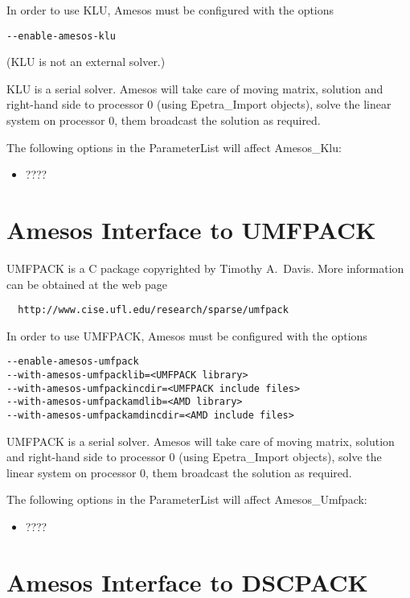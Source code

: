 \documentclass[11pt]{SANDreport}
\begin{document}
\smallskip

In order to use KLU, Amesos must be configured with the options
\begin{verbatim}
--enable-amesos-klu
\end{verbatim}
(KLU is not an external solver.)

KLU is a serial solver. Amesos will take care of moving matrix,
solution and right-hand side to processor 0 (using Epetra\_Import
objects), solve the linear system on processor 0, them broadcast the
solution as required.

The following options in the ParameterList will affect Amesos\_Klu:
\begin{itemize}
\item ????
\end{itemize}


\section{Amesos Interface to UMFPACK}
\label{sec:umfpack}

UMFPACK is a C package copyrighted by Timothy A.~Davis. More information
can be obtained at the web page
\begin{verbatim}
  http://www.cise.ufl.edu/research/sparse/umfpack
\end{verbatim}

In order to use UMFPACK, Amesos must be configured with the options
\begin{verbatim}
--enable-amesos-umfpack 
--with-amesos-umfpacklib=<UMFPACK library> 
--with-amesos-umfpackincdir=<UMFPACK include files>
--with-amesos-umfpackamdlib=<AMD library>
--with-amesos-umfpackamdincdir=<AMD include files>
\end{verbatim}

UMFPACK is a serial solver. Amesos will take care of moving matrix,
solution and right-hand side to processor 0 (using Epetra\_Import
objects), solve the linear system on processor 0, them broadcast the
solution as required.

The following options in the ParameterList will affect Amesos\_Umfpack:
\begin{itemize}
\item ????
\end{itemize}


\section{Amesos Interface to DSCPACK}
\label{sec:dscpack}
\end{document}
